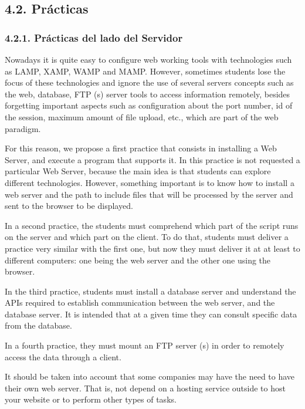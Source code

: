 \subsection{4.2. Prácticas}

\subsubsection{4.2.1. Prácticas del lado del Servidor}
Nowadays it is quite easy to configure web working tools with technologies such as LAMP, XAMP, WAMP 
and MAMP. However, sometimes students lose the focus of these technologies and ignore the use of 
several servers concepts such as the web, database, FTP (s) server tools to access information remotely, 
besides forgetting important aspects such as configuration about the port number, id of the 
session, maximum amount of file upload, etc., which are part of the web paradigm.

For this reason, we propose a first practice that consists in installing a Web Server, and execute 
a program that supports it. In this practice is not requested a particular Web Server, because the main 
idea is that students can explore different technologies. However, something important is to know how 
to install a web server and the path to include files that will be processed by the server and sent
to the browser to be displayed. 

In a second practice, the students must comprehend which part of the script runs on the server and which 
part on the client. To do that, students must deliver a practice very similar with the first one, but now
they must deliver it at at least to different computers: one being the web server and the other one using
the browser.

In the third practice, students must install a database server and understand the APIs required to 
establish communication between the web server, and the database server. It is intended that at a given 
time they can consult specific data from the database.


In a fourth practice, they must mount an FTP server (s) in order to remotely access the data through a client.

It should be taken into account that some companies may have the need to have their own web server. 
That is, not depend on a hosting service outside to host your website or to perform other types of 
tasks.

